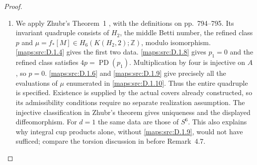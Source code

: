 \begin{proof}
\begin{enumerate}[label=\arabic*.,leftmargin=*]
\item We apply Zhubr's Theorem~1 \cite{manZhubr75}, with the definitions
on pp.~794--795. Its invariant quadruple consists of $H_2$, the
middle Betti number, the refined class $p$ and
$\mu=f_*[M]\in H_6(K(H_2,2);\mathbb Z)$, modulo isomorphism.
\ref{maps:src:D.1.4} gives the first two data. \ref{maps:src:D.1.8} gives $p_1=0$ and the refined
class satisfies $4p=\operatorname{PD}(p_1)$. Multiplication by four
is injective on $A$, so $p=0$. \ref{maps:src:D.1.6} and \ref{maps:src:D.1.9} give precisely all
the evaluations of $\mu$ enumerated in \ref{maps:src:D.1.10}. Thus the entire
quadruple is specified. Existence is supplied by the actual covers
already constructed, so its admissibility conditions require no
separate realization assumption. The injective classification in
Zhubr's theorem gives uniqueness and the displayed diffeomorphism.
For $d=1$ the same data are those of $S^6$. This also explains why
integral cup products alone, without \ref{maps:src:D.1.9}, would not have sufficed;
compare the torsion discussion in \cite{manReiser24} before Remark~4.7.
\end{enumerate}
\end{proof}
